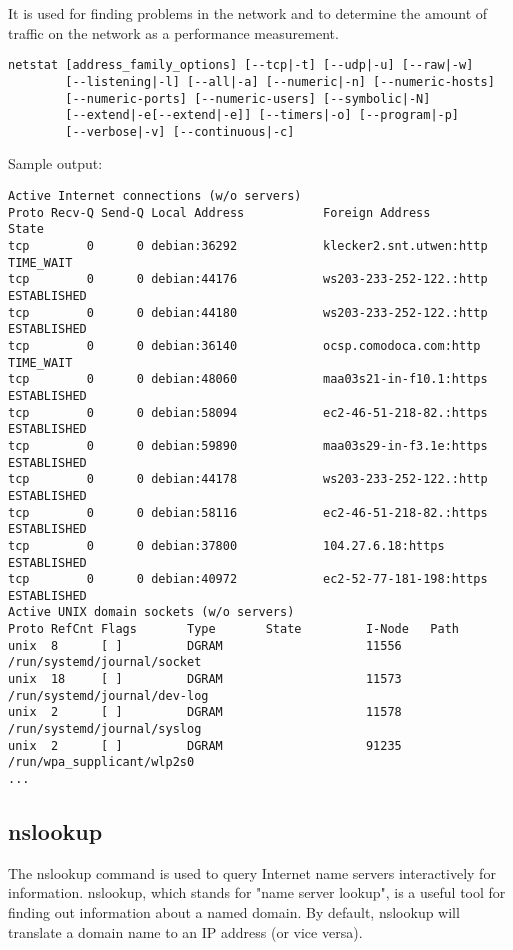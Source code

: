 \documentclass[a4paper,12pt]{article}
\begin{document}
It is used for finding problems in the network and to determine the amount of traffic on the network as a performance measurement.

\begin{verbatim}
netstat [address_family_options] [--tcp|-t] [--udp|-u] [--raw|-w]
        [--listening|-l] [--all|-a] [--numeric|-n] [--numeric-hosts]
        [--numeric-ports] [--numeric-users] [--symbolic|-N]
        [--extend|-e[--extend|-e]] [--timers|-o] [--program|-p]
        [--verbose|-v] [--continuous|-c]
\end{verbatim}

Sample output:
\begin{verbatim}
Active Internet connections (w/o servers)
Proto Recv-Q Send-Q Local Address           Foreign Address         State
tcp        0      0 debian:36292            klecker2.snt.utwen:http TIME_WAIT
tcp        0      0 debian:44176            ws203-233-252-122.:http ESTABLISHED
tcp        0      0 debian:44180            ws203-233-252-122.:http ESTABLISHED
tcp        0      0 debian:36140            ocsp.comodoca.com:http  TIME_WAIT
tcp        0      0 debian:48060            maa03s21-in-f10.1:https ESTABLISHED
tcp        0      0 debian:58094            ec2-46-51-218-82.:https ESTABLISHED
tcp        0      0 debian:59890            maa03s29-in-f3.1e:https ESTABLISHED
tcp        0      0 debian:44178            ws203-233-252-122.:http ESTABLISHED
tcp        0      0 debian:58116            ec2-46-51-218-82.:https ESTABLISHED
tcp        0      0 debian:37800            104.27.6.18:https       ESTABLISHED
tcp        0      0 debian:40972            ec2-52-77-181-198:https ESTABLISHED
Active UNIX domain sockets (w/o servers)
Proto RefCnt Flags       Type       State         I-Node   Path
unix  8      [ ]         DGRAM                    11556    /run/systemd/journal/socket
unix  18     [ ]         DGRAM                    11573    /run/systemd/journal/dev-log
unix  2      [ ]         DGRAM                    11578    /run/systemd/journal/syslog
unix  2      [ ]         DGRAM                    91235    /run/wpa_supplicant/wlp2s0
...
\end{verbatim}




\subsection{nslookup}
The nslookup command is used to query Internet name servers interactively for information.
nslookup, which stands for "name server lookup", is a useful tool for finding out information about a named domain.
By default, nslookup will translate a domain name to an IP address (or vice versa).
\end{document}
